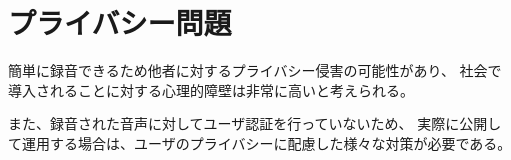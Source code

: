 \section{プライバシー問題}
簡単に録音できるため他者に対するプライバシー侵害の可能性があり、
社会で導入されることに対する心理的障壁は非常に高いと考えられる\cite{Kawamura}。

また、録音された音声に対してユーザ認証を行っていないため、
実際に公開して運用する場合は、ユーザのプライバシーに配慮した様々な対策が必要である。